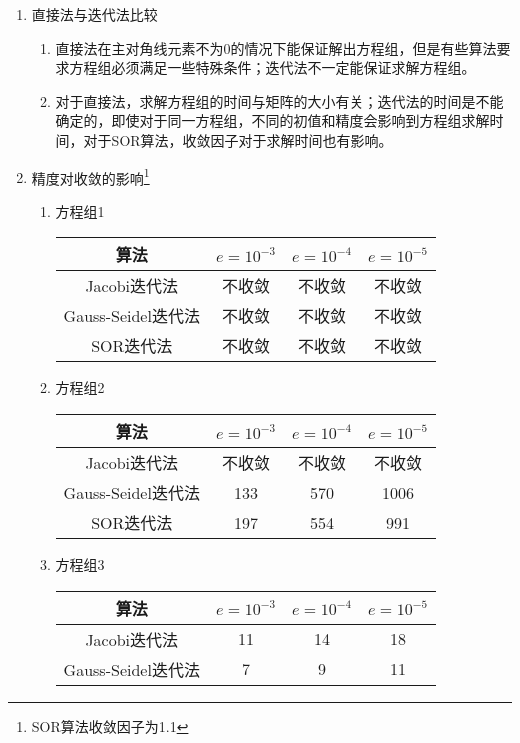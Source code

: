 \documentclass[a4paper,11pt]{article}
\begin{document}
\begin{enumerate}
	\item 直接法与迭代法比较
	\begin{enumerate}[(1)]
	\item 直接法在主对角线元素不为0的情况下能保证解出方程组，但是有些算法要求方程组必须满足一些特殊条件；迭代法不一定能保证求解方程组。
	\item 对于直接法，求解方程组的时间与矩阵的大小有关；迭代法的时间是不能确定的，即使对于同一方程组，不同的初值和精度会影响到方程组求解时间，对于SOR算法，收敛因子对于求解时间也有影响。
	\end{enumerate}
	\item 精度对收敛的影响\footnote{SOR算法收敛因子为1.1}
	\begin{enumerate}[(1)]
		\item 方程组1
			\begin{center}
			\begin{tabular}{|c|c|c|c|}	
			\hline
			算法 & $e=10^{-3}$ & $e=10^{-4}$ & $e=10^{-5}$ \\
			\hline
			Jacobi迭代法 & 不收敛 & 不收敛 & 不收敛\\
			\hline
			Gauss-Seidel迭代法 & 不收敛 & 不收敛 & 不收敛\\
			\hline
			SOR迭代法 & 不收敛 & 不收敛 & 不收敛\\
			\hline
			\end{tabular}
		\end{center}
		\item 方程组2
		\begin{center}
			\begin{tabular}{|c|c|c|c|}
			\hline
			算法 & $e=10^{-3}$ & $e=10^{-4}$ & $e=10^{-5}$ \\
			\hline
			Jacobi迭代法 & 不收敛 & 不收敛 & 不收敛\\
			\hline
			Gauss-Seidel迭代法 & 133 & 570 & 1006\\
			\hline
			SOR迭代法 & 197 & 554 & 991 \\
		 	\hline
			\end{tabular}
		\end{center}
		\item 方程组3
			\begin{center}
			\begin{tabular}{|c|c|c|c|}
			\hline
			算法 & $e=10^{-3}$ & $e=10^{-4}$ & $e=10^{-5}$ \\
			\hline
			Jacobi迭代法 & 11 & 14 & 18\\
			\hline
			Gauss-Seidel迭代法 & 7 & 9 & 11\\

\end{tabular}
\end{center}
\end{enumerate}
\end{enumerate}
\end{document}
